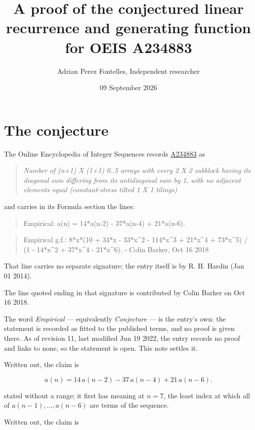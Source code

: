 \documentclass[11pt]{article}
\title{A proof of the conjectured linear recurrence and generating function for OEIS A234883}
\author{Adrian Perez Fontelles, Independent researcher}
\date{09 September 2026}
\theoremstyle{definition}
\begin{document}
\maketitle
\section{The conjecture}

The Online Encyclopedia of Integer Sequences records \href{https://oeis.org/A234883}{A234883} as

\begin{quote}\itshape Number of (n+1) X (1+1) 0..5 arrays with every 2 X 2 subblock having its diagonal sum differing from its antidiagonal sum by 1, with no adjacent elements equal (constant-stress tilted 1 X 1 tilings)\end{quote}

and carries in its Formula section the lines:

\begin{quote}\ttfamily Empirical: a(n) = 14*a(n-2) - 37*a(n-4) + 21*a(n-6).\end{quote}

\begin{quote}\ttfamily Empirical g.f.: 8*x*(10 + 34*x - 33*x\textasciicircum{}2 - 114*x\textasciicircum{}3 + 21*x\textasciicircum{}4 + 73*x\textasciicircum{}5) / (1 - 14*x\textasciicircum{}2 + 37*x\textasciicircum{}4 - 21*x\textasciicircum{}6). - Colin Barker, Oct 16 2018\end{quote}

That line carries no separate signature; the entry itself is by R. H. Hardin (Jan 01 2014).

The line quoted ending in that signature is contributed by Colin Barker on Oct 16 2018.

The word {\itshape Empirical} --- equivalently {\itshape Conjecture} --- is the entry's own: the statement is recorded as fitted to the published terms, and no proof is given there. As of revision 11, last modified Jun 19 2022, the entry records no proof and links to none, so the statement is open. This note settles it.

Written out, the claim is

\[a(n) = 14\,a(n-2) - 37\,a(n-4) + 21\,a(n-6).\]

stated without a range; it first has meaning at $n = 7$, the least index at which all of $a(n-1),\dots,a(n-6)$ are terms of the sequence.

Written out, the claim is
\end{document}

